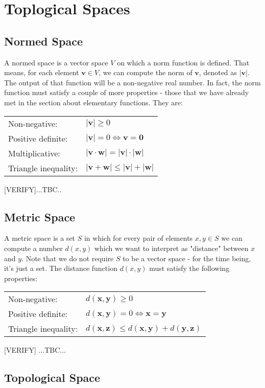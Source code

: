\section{Toplogical Spaces}

\subsection{Normed Space}
A normed space is a vector space $V$ on which a norm function is defined. That means, for each element $\mathbf{v} \in V$, we can compute the norm of $\mathbf{v}$, denoted as $|\mathbf{v}|$. The output of that function will be a non-negative real number. In fact, the norm function must satisfy a couple of more properties - those that we have already met in the section about elementary functions. They are:

\medskip
\begin{tabular}{l l}
Non-negative:         & $|\mathbf{v}| \geq 0$  \\
Positive definite:    & $|\mathbf{v}| = 0 \Leftrightarrow \mathbf{v} = \mathbf{0}$  \\
Multiplicative:       & $|\mathbf{v} \cdot \mathbf{w}| = |\mathbf{v}| \cdot |\mathbf{w}| $  \\
Triangle inequality:  & $|\mathbf{v} + \mathbf{w}| \leq |\mathbf{v}| + |\mathbf{w}| $
\end{tabular}
\medskip

[VERIFY]...TBC..

\subsection{Metric Space}
A metric space is a set $S$ in which for every pair of elements $x,y \in S$ we can compute a number $d(x,y)$ which we want to interpret as "distance" between $x$ and $y$. Note that we do not require $S$ to be a vector space - for the time being, it's just a set. The distance function $d(x,y)$ must satisfy the following properties:

\medskip
\begin{tabular}{l l}
Non-negative:         & $d(\mathbf{x, y}) \geq 0$  \\
Positive definite:    & $d(\mathbf{x,y }) = 0 \Leftrightarrow \mathbf{x} = \mathbf{y}$  \\
Triangle inequality:  & $d(\mathbf{x,z}) \leq d(\mathbf{x,y}) + d(\mathbf{y,z})$
\end{tabular}
\medskip

[VERIFY] ...TBC...



\subsection{Topological Space}

\begin{comment}



\end{comment}